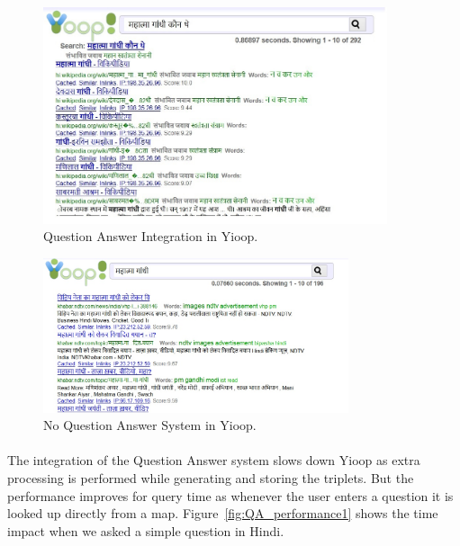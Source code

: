 \begin{figure}[htb]
\centering
\includegraphics[width=0.9\textwidth]{images/QA_IntegratedInYioop.jpg}
\caption{Question Answer Integration in Yioop.} 
\label{fig:QA_IntegratedInYioop}
\end{figure}
\break

\begin{figure}[htb]
\centering
\includegraphics[width=0.8\textwidth]{images/Yioop_NoQA.jpg}
\caption{No Question Answer System in Yioop.} 
\label{fig:Yioop_NoQA}
\end{figure}

\paragraph{}
The integration of the Question Answer system slows down Yioop as extra processing is performed while generating and storing the triplets. But the performance improves for query time as whenever the  user enters a question it is looked up directly from a map. Figure~\ref{fig:QA_performance1} shows the time impact when we asked a simple question in Hindi.


